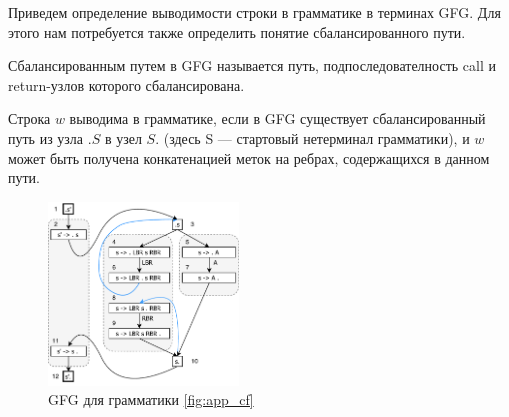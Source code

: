 Приведем определение выводимости строки в грамматике в терминах GFG. Для этого нам потребуется также определить понятие сбалансированного пути.

\begin{definition}
	Сбалансированным путем в GFG называется путь, подпоследователность call и return-узлов которого сбалансирована. 
\end{definition}

\begin{definition}
	Строка $w$ выводима в грамматике, если в GFG существует сбалансированный путь из узла $.S$ в узел $S.$ (здесь S --- стартовый нетерминал грамматики), и $w$ может быть получена конкатенацией меток на ребрах, содержащихся в данном пути. 
\end{definition}



\begin{figure}[h]
	\centering
	\includegraphics[width=0.45\textwidth]{pictures/gfg_enum}
	\caption{GFG для грамматики \ref{fig:app_cf}}
	\label{fig:gfg}
\end{figure}
